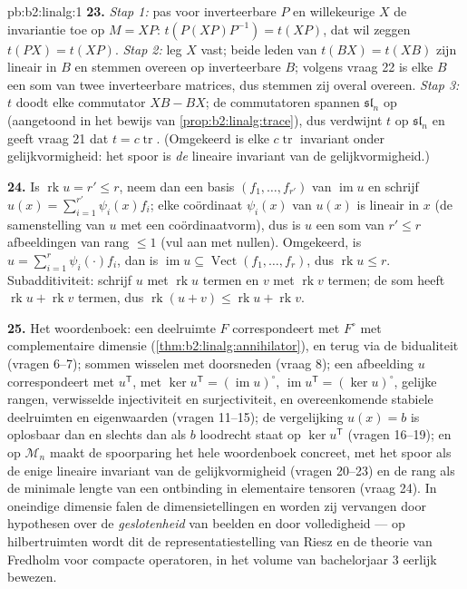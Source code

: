 \begin{solution}{pb:b2:linalg:1}
\textbf{23.} \emph{Stap 1:} pas voor inverteerbare $P$ en
willekeurige $X$ de invariantie toe op $M = XP$: $t(P(XP)P^{-1}) =
t(XP)$, dat wil zeggen $t(PX) = t(XP)$. \emph{Stap 2:} leg $X$
vast; beide leden van $t(BX) = t(XB)$ zijn lineair in $B$ en
stemmen overeen op inverteerbare $B$; volgens vraag 22 is elke $B$
een som van twee inverteerbare matrices, dus stemmen zij overal
overeen. \emph{Stap 3:} $t$ doodt elke commutator $XB - BX$; de
commutatoren spannen $\mathfrak{sl}_n$ op (aangetoond in het
bewijs van \cref{prop:b2:linalg:trace}), dus verdwijnt $t$ op
$\mathfrak{sl}_n$ en geeft vraag 21 dat $t = c\operatorname{tr}$.
(Omgekeerd is elke $c\operatorname{tr}$ invariant onder
gelijkvormigheid: het spoor is \emph{de} lineaire invariant van de
gelijkvormigheid.)

\textbf{24.} Is $\operatorname{rk} u = r' \leq r$, neem dan een
basis $(f_1, \dots, f_{r'})$ van $\operatorname{im} u$ en schrijf
$u(x) = \sum_{i=1}^{r'} \psi_i(x) f_i$; elke coördinaat
$\psi_i(x)$ van $u(x)$ is lineair in $x$ (de samenstelling van $u$
met een coördinaatvorm), dus is $u$ een som van $r' \leq r$
afbeeldingen van rang $\leq 1$ (vul aan met nullen). Omgekeerd, is
$u = \sum_{i=1}^r \psi_i(\cdot)f_i$, dan is $\operatorname{im} u
\subseteq \operatorname{Vect}(f_1, \dots, f_r)$, dus
$\operatorname{rk} u \leq r$. Subadditiviteit: schrijf $u$ met
$\operatorname{rk} u$ termen en $v$ met $\operatorname{rk} v$
termen; de som heeft $\operatorname{rk} u + \operatorname{rk} v$
termen, dus $\operatorname{rk}(u + v) \leq \operatorname{rk} u +
\operatorname{rk} v$.

\textbf{25.} Het woordenboek: een deelruimte $F$ correspondeert met
$F^\circ$ met complementaire dimensie
(\cref{thm:b2:linalg:annihilator}), en terug via de bidualiteit
(vragen 6--7); sommen wisselen met doorsneden (vraag 8); een
afbeelding $u$ correspondeert met $u^{\mathsf T}$, met $\ker
u^{\mathsf T} = (\operatorname{im}u)^\circ$,
$\operatorname{im}u^{\mathsf T} = (\ker u)^\circ$, gelijke rangen,
verwisselde injectiviteit en surjectiviteit, en overeenkomende
stabiele deelruimten en eigenwaarden (vragen 11--15); de
vergelijking $u(x) = b$ is oplosbaar dan en slechts dan als $b$
loodrecht staat op $\ker u^{\mathsf T}$ (vragen 16--19); en op
$\mathcal{M}_n$ maakt de spoorparing het hele woordenboek
concreet, met het spoor als de enige lineaire invariant van de
gelijkvormigheid (vragen 20--23) en de rang als de minimale lengte
van een ontbinding in elementaire tensoren (vraag 24). In
oneindige dimensie falen de dimensietellingen en worden zij
vervangen door hypothesen over de \emph{geslotenheid} van beelden
en door volledigheid --- op hilbertruimten wordt dit de
representatiestelling van Riesz en de theorie van Fredholm voor
compacte operatoren, in het volume van bachelorjaar 3 eerlijk
bewezen.
\end{solution}
